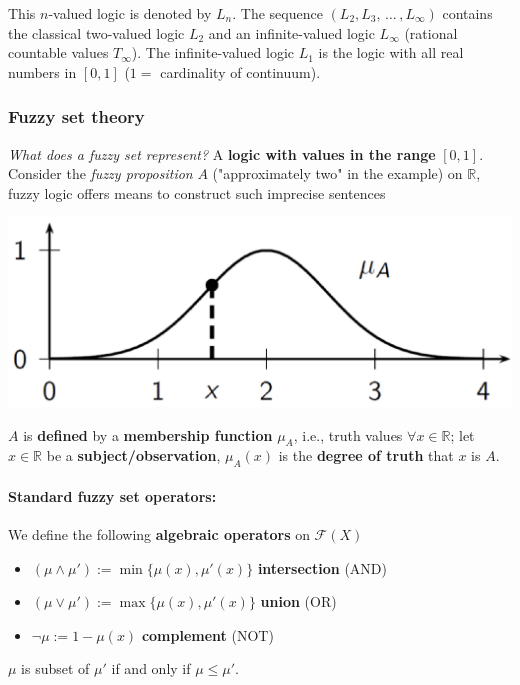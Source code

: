 \documentclass[11pt]{article}
\begin{document}
		This $n$-valued logic is denoted by $L_n$. The sequence $(L_2, L_3, \, \dots \, , L_{\infty})$ contains the classical two-valued logic $L_2$ and an infinite-valued logic $L_{\infty}$ (rational countable values $T_{\infty}$). The infinite-valued logic $L_1$ is the logic with all real numbers in $[0, 1]$ ($1=$ cardinality of continuum).
		
		\newpage
		
		\subsubsection{Fuzzy set theory}
		
		\textit{What does a fuzzy set represent?} A \textbf{logic with values in the range} $[0,1]$. \\
		
		Consider the \textit{fuzzy proposition} $A$ ("approximately two" in the example) on $\mathbb{R}$, fuzzy logic offers means to construct such imprecise sentences
		
		\begin{center}
			\includegraphics[width=0.6\columnwidth]{img/FS/appr2}
		\end{center}
		
		$A$ is \textbf{defined} by a \textbf{membership function} $\mu_A$, i.e., truth values $\forall x \in \mathbb{R}$; let $x \in \mathbb{R}$ be a \textbf{subject/observation}, $\mu_A (x)$ is the \textbf{degree of truth} that $x$ is $A$.\\
		
		\paragraph{Standard fuzzy set operators:} We define the following \textbf{algebraic operators} on $\mathcal{F} (X)$ 
		\begin{itemize}
			\item $(\mu \wedge \mu') := \min \{\mu(x), \mu' (x)\}$ \textbf{intersection} (AND)
			\item $(\mu \vee \mu') := \max \{\mu(x), \mu' (x)\}$ \textbf{union} (OR)
			\item $\neg \mu := 1 - \mu (x)$ \textbf{complement} (NOT)
		\end{itemize}
		$\mu$ is subset of $\mu'$ if and only if $\mu \leq \mu'$.\\
		
\end{document}
